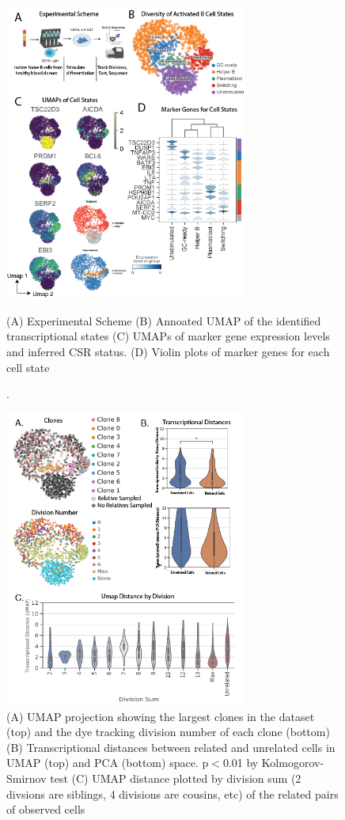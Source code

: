\begin{figure}[hbt!]
\centering
\includegraphics[width=8cm, keepaspectratio]{figs/prelim_paper2/BCellLineagePaper_Figure 1.png}
\caption[Experimental overview and transcriptional data for Naive B cell activation].{(A) Experimental Scheme (B) Annoated UMAP of the identified transcriptional states (C) UMAPs of marker gene expression levels and inferred CSR status. (D) Violin plots of marker genes for each cell state}
\label{fig:paper2_prelimfig_1}
\end{figure}

\begin{figure}[htb!]
\centering
\includegraphics[width=8cm, keepaspectratio]{figs/prelim_paper2/BCellLineagePaper_Figure 2.png}
\caption[Transcriptomic similarity of clones in vitro]{(A) UMAP projection showing the largest clones in the dataset (top) and the dye tracking division number of each clone (bottom) (B) Transcriptional distances between related and unrelated cells in UMAP (top) and PCA (bottom) space. p$<$0.01 by Kolmogorov-Smirnov test (C) UMAP distance plotted by division sum (2 divsions are siblings, 4 divisions are cousins, etc) of the related pairs of observed cells}
\label{fig:paper2_prelimfig_2}
\end{figure}

